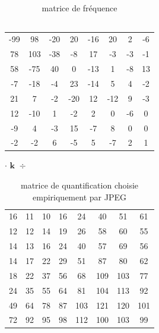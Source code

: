 \documentclass{article}
\begin{document}
\begin{minipage}{0.29\textwidth}
    \centering
    \begin{table}[H]
        \centering
        \setlength{\tabcolsep}{2pt} %
        \renewcommand{\arraystretch}{1.2} %

        \begin{tabular}{cccccccc}
            -99 & 98 & -20 & 20 & -16 & 20 & 2 & -6\\
            78 & 103 & -38 & -8 & 17 & -3 & -3 & -1\\
            58 & -75 & 40 & 0 & -13 & 1 & -8 & 13\\
            -7 & -18 & -4 & 23 & -14 & 5 & 4 & -2\\
            21 & 7 & -2 & -20 & 12 & -12 & 9 & -3\\
            12 & -10 & 1 & -2 & 2 & 0 & -6 & 0\\
            -9 & 4 & -3 & 15 & -7 & 8 & 0 & 0\\
            -2 & -2 & 6 & -5 & 5 & -7 & 2 & 1\\
        \end{tabular}
        \caption*{\centering matrice de fréquence \\ \ }
    \end{table}
\end{minipage}
\hfill
\begin{minipage}{0.09\textwidth}
    \centering
    \LARGE
    \vspace{-25pt}
    $ \textbf{$\cdot$ k $\div$} $
\end{minipage}
\hfill
\begin{minipage}{0.3\textwidth}
    \centering
    \begin{table}[H]
        \centering
        \setlength{\tabcolsep}{2pt} %
        \renewcommand{\arraystretch}{1.2} %
        \begin{tabular}{cccccccc}
            16 & 11 & 10 & 16 & 24 & 40 & 51 & 61\\
            12 & 12 & 14 & 19 & 26 & 58 & 60 & 55\\
            14 & 13 & 16 & 24 & 40 & 57 & 69 & 56\\
            14 & 17 & 22 & 29 & 51 & 87 & 80 & 62\\
            18 & 22 & 37 & 56 & 68 & 109 & 103 & 77\\
            24 & 35 & 55 & 64 & 81 & 104 & 113 & 92\\
            49 & 64 & 78 & 87 & 103 & 121 & 120 & 101\\
            72 & 92 & 95 & 98 & 112 & 100 & 103 & 99\\
        \end{tabular}
        \caption*{\centering matrice de quantification choisie empiriquement par JPEG}
    \end{table}
\end{minipage}
\end{document}
